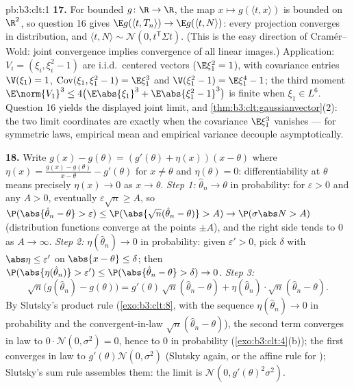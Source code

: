 \begin{solution}{pb:b3:clt:1}
\textbf{17.} For bounded  $g \colon \R \to \R$,
the map $x \mapsto g(\langle t, x\rangle)$ is bounded
 on $\R^2$, so question 16 gives $\E g(\langle
t, T_n\rangle) \to \E g(\langle t, N\rangle)$: every
projection converges in distribution, and $\langle t,
N\rangle \sim \mathcal N(0, t^{\mathsf T}\Sigma t)$. (This
is the easy direction of Cram\'er--Wold: joint convergence
implies convergence of all linear images.) Application:
$V_i = (\xi_i, \xi_i^2 - 1)$ are i.i.d.\ centered vectors
($\E\xi_1^2 = 1$), with covariance entries $\V(\xi_1) =
1$, $\operatorname{Cov}(\xi_1, \xi_1^2 - 1) = \E\xi_1^3$
and $\V(\xi_1^2 - 1) = \E\xi_1^4 - 1$; the third moment
$\E\norm{V_1}^3 \leq 4\bigl(\E\abs{\xi_1}^3 +
\E\abs{\xi_1^2 - 1}^3\bigr)$ is finite when $\xi_1 \in
L^6$. Question 16 yields the displayed joint 
limit, and \cref{thm:b3:clt:gaussianvector}(2): the two
limit coordinates are  exactly when the
covariance $\E\xi_1^3$ vanishes --- for symmetric laws,
empirical mean and empirical variance decouple
asymptotically.

\textbf{18.} Write $g(x) - g(\theta) = (g'(\theta) +
\eta(x))(x - \theta)$ where $\eta(x) = \frac{g(x) -
g(\theta)}{x - \theta} - g'(\theta)$ for $x \neq \theta$
and $\eta(\theta) = 0$: differentiability at $\theta$
means precisely $\eta(x) \to 0$ as $x \to \theta$.
\emph{Step 1:} $\hat\theta_n \to \theta$ in probability:
for $\varepsilon > 0$ and any $A > 0$, eventually
$\varepsilon\sqrt n \geq A$, so $\P(\abs{\hat\theta_n -
\theta} > \varepsilon) \leq \P(\abs{\sqrt
n(\hat\theta_n - \theta)} > A) \to \P(\sigma\abs N > A)$
(distribution functions converge at the  points
$\pm A$), and the right side tends to $0$ as $A \to
\infty$. \emph{Step 2:} $\eta(\hat\theta_n) \to 0$ in
probability: given $\varepsilon' > 0$, pick $\delta$ with
$\abs\eta \leq \varepsilon'$ on $\abs{x - \theta} \leq
\delta$; then $\P(\abs{\eta(\hat\theta_n)} > \varepsilon')
\leq \P(\abs{\hat\theta_n - \theta} > \delta) \to 0$.
\emph{Step 3:}
\[
\sqrt n\bigl(g(\hat\theta_n) - g(\theta)\bigr) =
g'(\theta)\,\sqrt n(\hat\theta_n - \theta) +
\eta(\hat\theta_n)\cdot\sqrt n(\hat\theta_n - \theta) .
\]
By Slutsky's product rule (\cref{exo:b3:clt:8}, with the
sequence $\eta(\hat\theta_n) \to 0$ in probability and the
convergent-in-law $\sqrt n(\hat\theta_n - \theta)$), the
second term converges in law to $0\cdot\mathcal N(0,
\sigma^2) = 0$, hence to $0$ in probability
(\cref{exo:b3:clt:4}(b)); the first converges in law to
$g'(\theta)\mathcal N(0, \sigma^2)$ (Slutsky again, or the
affine rule for ); Slutsky's sum
rule assembles them: the limit is $\mathcal N(0,
g'(\theta)^2\sigma^2)$.


\end{solution}
